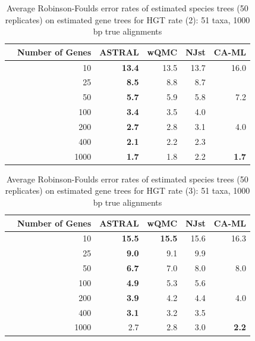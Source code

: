 \begin{table}[h!]
\begin{tabular}{rrrrrr}
 & Number of Genes & ASTRAL & wQMC   & NJst & CA-ML\\
\hline
 & 10 & \textbf{13.4} & 13.5 &   13.7 & 16.0 \\
 & 25 & \textbf{8.5} & 8.8 &  8.7 & \\
 & 50 & \textbf{5.7} & 5.9 & 5.8 & 7.2\\
 & 100 & \textbf{3.4} & 3.5  & 4.0 & \\
 & 200 & \textbf{2.7} & 2.8   & 3.1 & 4.0\\
 & 400 & \textbf{2.1} & 2.2   & 2.3 & \\
 & 1000 & \textbf{1.7} & 1.8   & 2.2 & \textbf{1.7} \\
\end{tabular}
\caption[Error rates of estimated species trees (50 replicates)  on estimated gene trees for HGT rate 2]{Average Robinson-Foulds error rates of estimated species trees (50 replicates)  on estimated gene trees for HGT rate (2): 51 taxa, 1000 bp true alignments}

\label{hgt::table2}
\end{table}

\begin{table}[h!]
\begin{tabular}{rrrrrr}
 & Number of Genes & ASTRAL & wQMC   & NJst  & CA-ML\\
\hline
 & 10 & \textbf{15.5} & \textbf{15.5} &   15.6 & 16.3\\
 & 25 & \textbf{9.0} & 9.1 &  9.9 & \\
 & 50 & \textbf{6.7} & 7.0  & 8.0 & 8.0 \\
 & 100 & \textbf{4.9} & 5.3   & 5.6 & \\
 & 200 & \textbf{3.9} & 4.2   & 4.4 & 4.0 \\
 & 400 & \textbf{3.1} & 3.2   & 3.5 & \\
 & 1000 & 2.7 & 2.8 &   3.0 & \textbf{2.2} \\
\end{tabular}
\caption[Error rates of estimated species trees (50 replicates)  on estimated gene trees for HGT rate 3]{Average Robinson-Foulds error rates of estimated species trees (50 replicates)  on estimated gene trees for HGT rate (3): 51 taxa, 1000 bp true alignments}

\label{hgt::table3}
\end{table}

